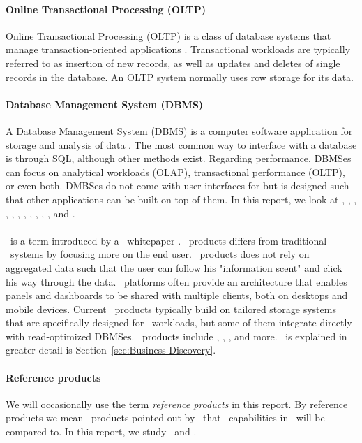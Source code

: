 \paragraph{Online Transactional Processing (OLTP)}
\label{par:Online Transactional Processing (OLTP)}
Online Transactional Processing (OLTP) is a class of database systems that manage transaction-oriented applications \cite{Wikipedia_contributors2015-cw}. Transactional workloads are typically referred to as insertion of new records, as well as updates and deletes of single records in the database. An OLTP system normally uses row storage for its data.

\paragraph{Database Management System (DBMS)}
\label{par:Database Management System (DBMS)}
A Database Management System (DBMS) is a computer software application for storage and analysis of data \cite{Wikipedia_contributors2015-pb}. The most common way to interface with a database is through SQL, although other methods exist. Regarding performance, DBMSes can focus on analytical workloads (OLAP), transactional performance (OLTP), or even both. DMBSes do not come with user interfaces for \bd but is designed such that other applications can be built on top of them. In this report, we look at \oracle, \ibm, \saph, \sapnw, \mssql, \cstore, \vertica, \blink, \exasol, \oracle, \hyper, and \hyrise.

\paragraph{\bd}
\label{par:Business Discovery}
\bd~is a term introduced by a \qlikview~whitepaper \cite{Qlik2014-vd}. \bd~products differs from traditional \bi~systems by focusing more on the end user. \bd~products does not rely on aggregated data such that the user can follow his "information scent" and click his way through the data. \bd~platforms often provide an architecture that enables panels and dashboards to be shared with multiple clients, both on desktops and mobile devices. Current \bd~products typically build on tailored storage systems that are specifically designed for \bd~workloads, but some of them integrate directly with read-optimized DBMSes. \bd~products include \tableau, \qlikview, \powerpivot, and more. \bd~is explained in greater detail is Section~\ref{sec:Business Discovery}.

\paragraph{Reference products}
\label{par:Reference products}
We will occasionally use the term \textit{reference products} in this report. By reference products we mean \bd~products pointed out by \genus~that \bd~capabilities in \genusSoftware~will be compared to. In this report, we study \qlikview~and \tableau.

